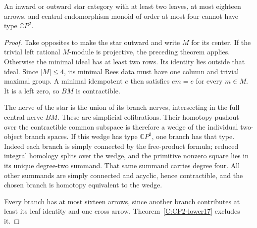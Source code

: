 \begin{corollary}\label{C:star-small-center18}
An inward or outward star category with at least two leaves,
at most eighteen arrows, and central endomorphism monoid of
order at most four cannot have type $\mathbb CP^2$.
\end{corollary}
\begin{proof}
Take opposites to make the star outward and write $M$ for
its center. If the trivial left rational $M$-module is
projective, the preceding theorem applies. Otherwise the
minimal ideal has at least two rows. Its identity lies
outside that ideal. Since $|M|\leq4$, its minimal Rees
data must have one column and trivial maximal group.
A minimal idempotent $e$ then satisfies $em=e$ for every
$m\in M$. It is a left zero, so $BM$ is contractible.

The nerve of the star is the union of its branch nerves,
intersecting in the full central nerve $BM$. These are
simplicial cofibrations. Their homotopy pushout over the
contractible common subspace is therefore a wedge of the
individual two-object branch spaces. If this wedge has
type $\mathbb CP^2$, one branch has that type. Indeed each
branch is simply connected by the free-product formula;
reduced integral homology splits over the wedge, and the
primitive nonzero square lies in its unique degree-two
summand. That same summand carries degree four. All other
summands are simply connected and acyclic, hence contractible,
and the chosen branch is homotopy equivalent to the wedge.

Every branch has at most sixteen arrows, since another
branch contributes at least its leaf identity and one
cross arrow. Theorem~\ref{C:CP2-lower17} excludes it.
\end{proof}
